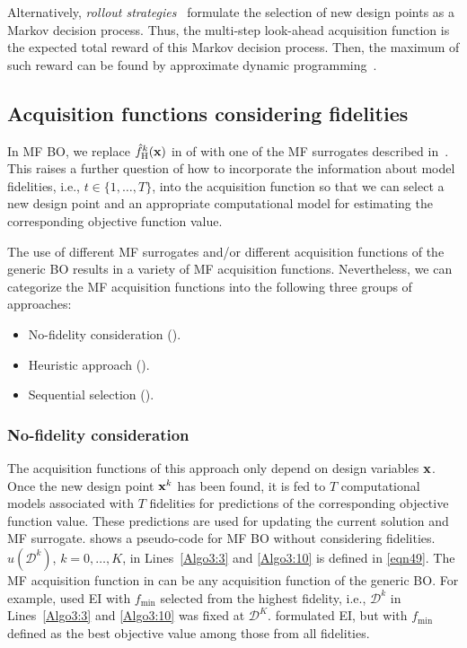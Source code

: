 \documentclass[journal ]{new-aiaa}
\begin{document}
	Alternatively, \textit{rollout strategies}~\citep{Lam2016,Lee2020} formulate the selection of new design points as a Markov
	decision process.
	Thus, the multi-step look-ahead acquisition function is the expected total reward of this Markov
	decision process.
	Then, the maximum of such reward can be found by approximate dynamic programming~\citep{Powell2011}.
	
	\subsection{Acquisition functions considering fidelities}\label{Sec52}
	
	In MF BO, we replace $\hat{f}_\text{H}^k({\bf x})$ in  of  with one of the MF surrogates described in~.
	This raises a further question of how to incorporate the information about model fidelities, i.e., $t \in \{1,\dots,T\}$, into the acquisition function so that we can select a new design point and an appropriate computational model for estimating the corresponding objective function value. 
	
	The use of different MF surrogates and/or different acquisition functions of the generic BO results in a variety of MF acquisition functions. Nevertheless, we can categorize the MF acquisition functions into the following three groups of approaches: 
	\begin{itemize}
		\item No-fidelity consideration ().
		
		\item Heuristic approach ().
		
		\item Sequential selection ().
		
	\end{itemize}
	
	\subsubsection{No-fidelity consideration}\label{Sec521}
	
	The acquisition functions of this approach only depend on design variables $\bf x$.
	Once the new design point ${\bf x}^k$ has been found, it is fed to $T$ computational models associated with $T$ fidelities for predictions of the corresponding objective function value.
	These predictions are used for updating the current solution and MF surrogate.
	 shows a pseudo-code for MF BO without considering fidelities.
	$u(\mathcal{D}^k)$, $k=0,\dots,K$, in Lines~\ref{Algo3:3} and \ref{Algo3:10} is defined in \cref{eqn49}.
	The MF acquisition function in  can be any acquisition function of the generic BO.
	For example, \citet{Forrester2007} used EI with $f_{\min}$ selected from the highest fidelity, i.e., $\mathcal{D}^k$ in Lines~\ref{Algo3:3} and \ref{Algo3:10} was fixed at $\mathcal{D}^K$.
	\citet{Perdikaris2016} formulated EI, but with $f_{\min}$ defined as the best objective value among those from all fidelities.
	
\end{document}
